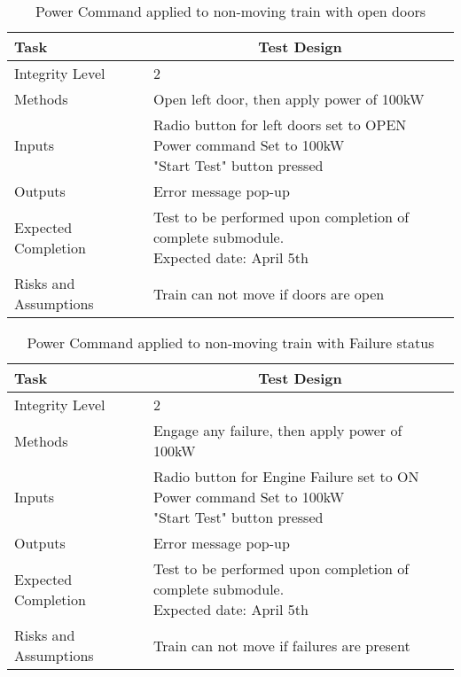 \documentclass[]{article}
\begin{document}
	\begin{table}[H]
		\centering
		\caption{Power Command applied to non-moving train with open doors}
		\begin{tabular}{|l|l|}
			\hline
			Task & \multicolumn{1}{c|}{Test Design} \\ \hline
			Integrity Level & 2 \\ \hline
			Methods & Open left door, then apply power of 100kW  \\ \hline
			Inputs &  \parbox[t]{10cm}{Radio button for left doors set to OPEN\\ Power command Set to 100kW\\ "Start Test" button pressed }\\ \hline
			Outputs & Error message pop-up\\ \hline
			Expected Completion & \parbox[t]{10cm}{Test to be performed upon completion of complete submodule.\\ Expected date: April 5th}\\ \hline
			Risks and Assumptions & Train can not move if doors are open\\ \hline
		\end{tabular}
	\end{table}

	\begin{table}[H]
		\centering
		\caption{Power Command applied to non-moving train with Failure status}
		\begin{tabular}{|l|l|}
			\hline
			Task & \multicolumn{1}{c|}{Test Design} \\ \hline
			Integrity Level & 2 \\ \hline
			Methods & Engage any failure, then apply power of 100kW  \\ \hline
			Inputs &  \parbox[t]{10cm}{Radio button for Engine Failure set to ON\\ Power command Set to 100kW\\ "Start Test" button pressed }\\ \hline
			Outputs & Error message pop-up\\ \hline
			Expected Completion & \parbox[t]{10cm}{Test to be performed upon completion of complete submodule.\\ Expected date: April 5th}\\ \hline
			Risks and Assumptions & Train can not move if failures are present\\ \hline
		\end{tabular}
	\end{table}
\end{document}
